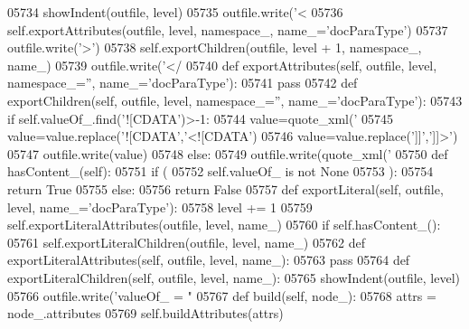 \begin{DoxyCode}
{{{{{{{{{{{{{{{{{{{{{{{{{{{{{{{{{{{{{{{{{{{{{{{{{{{{{{{{{{{{{{{{{{{{{{{{{{{{{{{{{{{{{{{{{{{{{{{{{{{{{{{{{{{{{{{{{{{{{{{{{{{{{{{{{{{{{{{{{{{{{{{{{{{{{{{{{{{{{{{{{{{{{{{{{{{{{{{{{{{{{{{{{{{{{{{{{{{{{{{{{{{{{{{{{{{{{{{{{{{{{{{{{{{{{{{{{{{{{{{{{{{{{{{{{{{{{{{{{{{{{{{{{{{{{{{{{{{{{{{{{{{{{{{{{{{{{{{{{{{{{{{{{{{{{{{{{{{{{{{{{{{{{{{{{{{{{{{{{{{{{{{{{{{{{{{05734         showIndent(outfile, level)
05735         outfile.write(\textcolor{stringliteral}{'<%
05736         self.exportAttributes(outfile, level, namespace\_, name\_=\textcolor{stringliteral}{'docParaType'})
05737         outfile.write(\textcolor{stringliteral}{'>'})
05738         self.exportChildren(outfile, level + 1, namespace\_, name\_)
05739         outfile.write(\textcolor{stringliteral}{'</%
05740     \textcolor{keyword}{def }exportAttributes(self, outfile, level, namespace\_='', name\_='docParaType'):
05741         \textcolor{keywordflow}{pass}
05742     \textcolor{keyword}{def }exportChildren(self, outfile, level, namespace\_='', name\_='docParaType'):
05743         \textcolor{keywordflow}{if} self.valueOf\_.find(\textcolor{stringliteral}{'![CDATA'})>-1:
05744             value=quote_xml(\textcolor{stringliteral}{'%
05745             value=value.replace(\textcolor{stringliteral}{'![CDATA'},\textcolor{stringliteral}{'<![CDATA'})
05746             value=value.replace(\textcolor{stringliteral}{']]'},\textcolor{stringliteral}{']]>'})
05747             outfile.write(value)
05748         \textcolor{keywordflow}{else}:
05749             outfile.write(quote_xml(\textcolor{stringliteral}{'%
05750     \textcolor{keyword}{def }hasContent_(self):
05751         \textcolor{keywordflow}{if} (
05752             self.valueOf_ \textcolor{keywordflow}{is} \textcolor{keywordflow}{not} \textcolor{keywordtype}{None}
05753             ):
05754             \textcolor{keywordflow}{return} \textcolor{keyword}{True}
05755         \textcolor{keywordflow}{else}:
05756             \textcolor{keywordflow}{return} \textcolor{keyword}{False}
05757     \textcolor{keyword}{def }exportLiteral(self, outfile, level, name\_='docParaType'):
05758         level += 1
05759         self.exportLiteralAttributes(outfile, level, name\_)
05760         \textcolor{keywordflow}{if} self.hasContent_():
05761             self.exportLiteralChildren(outfile, level, name\_)
05762     \textcolor{keyword}{def }exportLiteralAttributes(self, outfile, level, name\_):
05763         \textcolor{keywordflow}{pass}
05764     \textcolor{keyword}{def }exportLiteralChildren(self, outfile, level, name\_):
05765         showIndent(outfile, level)
05766         outfile.write(\textcolor{stringliteral}{'valueOf\_ = "%
05767     \textcolor{keyword}{def }build(self, node\_):
05768         attrs = node\_.attributes
05769         self.buildAttributes(attrs)
}}}}}}}}}}}}}}}}}}}}}}}}}}}}}}}}}}}}}}}}}}}}}}}}}}}}}}}}}}}}}}}}}}}}}}}}}}}}}}}}}}}}}}}}}}}}}}}}}}}}}}}}}}}}}}}}}}}}}}}}}}}}}}}}}}}}}}}}}}}}}}}}}}}}}}}}}}}}}}}}}}}}}}}}}}}}}}}}}}}}}}}}}}}}}}}}}}}}}}}}}}}}}}}}}}}}}}}}}}}}}}}}}}}}}}}}}}}}}}}}}}}}}}}}}}}}}}}}}}}}}}}}}}}}}}}}}}}}}}}}}}}}}}}}}}}}}}}}}}}}}}}}}}}}}}}}}}}}}}}}}}}}}}}}}}}}}}}}}}}}}}}}}}}}}}}}}}}}
\end{DoxyCode}
